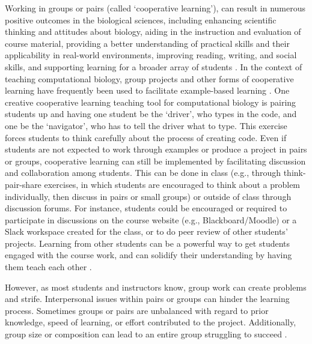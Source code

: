 Working in groups or pairs (called `cooperative learning'), can result in numerous positive outcomes in the biological sciences, including enhancing scientific thinking and attitudes about biology, aiding in the instruction and evaluation of course material, providing a better understanding of practical skills and their applicability in real-world environments, improving reading, writing, and social skills, and supporting learning for a broader array of students \citep[reviewed in][]{lord_101_2001}. 
In the context of teaching computational biology, group projects and other forms of cooperative learning have frequently been used to facilitate example-based learning  \citep[e.g.,][]{emery_application_2017,korcsmaros_teaching_2013,fuselier_trace_2011}.
One creative cooperative learning teaching tool for computational biology is pairing students up and having one student be the `driver', who types in the code, and one be the `navigator', who has to tell the driver what to type. 
This exercise forces students to think carefully about the process of creating code.
Even if students are not expected to work through examples or produce a project in pairs or groups, cooperative learning can still be implemented by facilitating discussion and collaboration among students.
This can be done in class (e.g., through think-pair-share exercises, in which students are encouraged to think about a problem individually, then discuss in pairs or small groups) or outside of class through discussion forums.
For instance, students could be encouraged or required to participate in discussions on the course website (e.g., Blackboard/Moodle) or a Slack workspace created for the class, or to do peer review of other students' projects. 
Learning from other students can be a powerful way to get students engaged with the course work, and can solidify their understanding by having them teach each other \citep{treisman1992studying}.

However, as most students and instructors know, group work can create problems and strife.
Interpersonal issues within pairs or groups can hinder the learning process.
Sometimes groups or pairs are unbalanced with regard to prior knowledge, speed of learning, or effort contributed to the project.
Additionally, group size or composition can lead to an entire group struggling to succeed \citep[e.g.,][]{compeau_establishing_2019}. 

